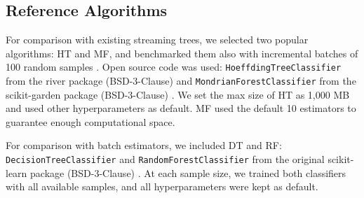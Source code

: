 
\subsection{Reference Algorithms}
For comparison with existing streaming trees, we selected two popular algorithms: HT and MF, and benchmarked them also with incremental batches of 100 random samples \citep{hoeffding, mondrian, OrpailleCC}. Open source code was used: \texttt{HoeffdingTreeClassifier} from the river package (BSD-3-Clause) and \texttt{MondrianForestClassifier} from the scikit-garden package (BSD-3-Clause) \citep{river, scikit-garden}. We set the max size of HT as 1,000 MB and used other hyperparameters as default. MF used the default 10 estimators to guarantee enough computational space.

For comparison with batch estimators, we included DT and RF: \texttt{DecisionTreeClassifier} and \texttt{RandomForestClassifier} from the original scikit-learn package (BSD-3-Clause) \citep{scikit-learn}. At each sample size, we trained both classifiers with all available samples, and all hyperparameters were kept as default. 


